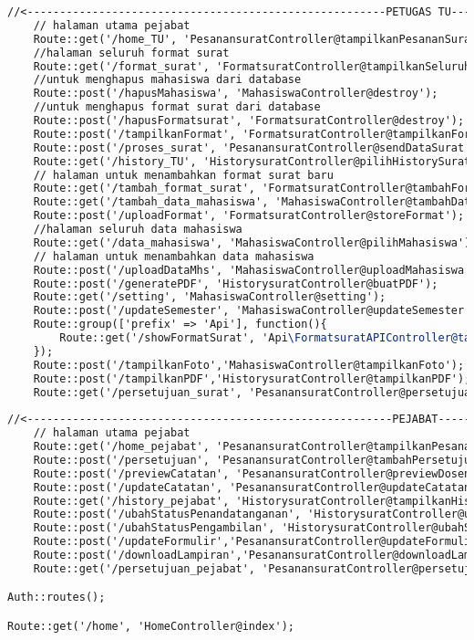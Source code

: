 \begin{lstlisting}[language=tex,basicstyle=
\tiny,caption=web.php]
//<-------------------------------------------------------PETUGAS TU------------------------------------------------------>
    // halaman utama pejabat
    Route::get('/home_TU', 'PesanansuratController@tampilkanPesananSurat');
    //halaman seluruh format surat
    Route::get('/format_surat', 'FormatsuratController@tampilkanSeluruhFormat');
    //untuk menghapus mahasiswa dari database
    Route::post('/hapusMahasiswa', 'MahasiswaController@destroy');
    //untuk menghapus format surat dari database
    Route::post('/hapusFormatsurat', 'FormatsuratController@destroy');
    Route::post('/tampilkanFormat', 'FormatsuratController@tampilkanFormat');
    Route::post('/proses_surat', 'PesanansuratController@sendDataSurat');
    Route::get('/history_TU', 'HistorysuratController@pilihHistorySurat');
    // halaman untuk menambahkan format surat baru
    Route::get('/tambah_format_surat', 'FormatsuratController@tambahFormat');
    Route::get('/tambah_data_mahasiswa', 'MahasiswaController@tambahDataMahasiswa');
    Route::post('/uploadFormat', 'FormatsuratController@storeFormat');
    //halaman seluruh data mahasiswa
    Route::get('/data_mahasiswa', 'MahasiswaController@pilihMahasiswa');
    // halaman untuk menambahkan data mahasiswa
    Route::post('/uploadDataMhs', 'MahasiswaController@uploadMahasiswa');
    Route::post('/generatePDF', 'HistorysuratController@buatPDF');
    Route::get('/setting', 'MahasiswaController@setting');
    Route::post('/updateSemester', 'MahasiswaController@updateSemester');
    Route::group(['prefix' => 'Api'], function(){
        Route::get('/showFormatSurat', 'Api\FormatsuratAPIController@tampilkanFormat');
    });
    Route::post('/tampilkanFoto','MahasiswaController@tampilkanFoto');
    Route::post('/tampilkanPDF','HistorysuratController@tampilkanPDF');
    Route::get('/persetujuan_surat', 'PesanansuratController@persetujuanPesananSurat');
    
//<--------------------------------------------------------PEJABAT-------------------------------------------------------->
    // halaman utama pejabat
    Route::get('/home_pejabat', 'PesanansuratController@tampilkanPesananDiPejabat');
    Route::post('/persetujuan', 'PesanansuratController@tambahPersetujuan');
    Route::post('/previewCatatan', 'PesanansuratController@previewDosen');
    Route::post('/updateCatatan', 'PesanansuratController@updateCatatan');
    Route::get('/history_pejabat', 'HistorysuratController@tampilkanHistoryDiPejabat');
    Route::post('/ubahStatusPenandatanganan', 'HistorysuratController@ubahStatusPenandatanganan');
    Route::post('/ubahStatusPengambilan', 'HistorysuratController@ubahStatusPengambilan');
    Route::post('/updateFormulir','PesanansuratController@updateFormulir');
    Route::post('/downloadLampiran','PesanansuratController@downloadLampiran');
    Route::get('/persetujuan_pejabat', 'PesanansuratController@persetujuanPesananDiPejabat');

Auth::routes();

Route::get('/home', 'HomeController@index');

\end{lstlisting}